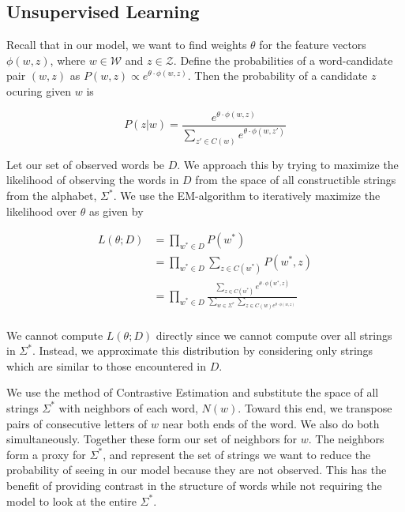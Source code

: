 \documentclass[11pt,twocolumn]{article}
\begin{document}
\subsection{Unsupervised Learning}
Recall that in our model, we want to find weights $\theta$ for the feature vectors $\phi(w,z)$, where $w\in\mathcal W$ and $z\in\mathcal Z$. Define the probabilities of a word-candidate pair $(w,z)$ as $P(w,z)\propto e^{\theta\cdot\phi(w,z)}$. Then the probability of a candidate $z$ ocuring given $w$ is

\begin{equation}
    \label{equ:prob_par}
    P(z|w) = \frac{e^{\theta\cdot\phi(w,z)}} {\sum_{z'\in C(w)} e^{\theta\cdot\phi(w,z')}}
\end{equation}

Let our set of observed words be $D$. We approach this by trying to maximize the likelihood of observing the words in $D$ from the space of all constructible strings from the alphabet, $\Sigma^*$. We use the EM-algorithm to iteratively maximize the likelihood over $\theta$ as given by

\begin{equation}
    \begin{split}
        L(\theta; D) &= \prod_{w^*\in D} P(w^*) \\
        &= \prod_{w^*\in D} \sum_{z\in C(w^*)} P(w^*, z) \\
        &= \prod_{w^*\in D} \frac{\sum_{z\in C(w^*)} e^{\theta\cdot\phi(w^*,z)}} {\sum_{w\in\Sigma^*}\sum_{z\in C(w) e^{\theta\cdot\phi(w,z)}}} \\
    \end{split}
\end{equation}

We cannot compute $L(\theta; D)$ directly since we cannot compute over all strings in $\Sigma^*$. Instead, we approximate this distribution by considering only strings which are similar to those encountered in $D$.

We use the method of Contrastive Estimation \citep{Smith05} and substitute the space of all strings $\Sigma^*$ with neighbors of each word, $N(w)$. Toward this end, we transpose pairs of consecutive letters of $w$ near both ends of the word. We also do both simultaneously. Together these form our set of neighbors for $w$. The neighbors form a proxy for $\Sigma^*$, and represent the set of strings we want to reduce the probability of seeing in our model because they are not observed. This has the benefit of providing contrast in the structure of words while not requiring the model to look at the entire $\Sigma^*$.
\end{document}
